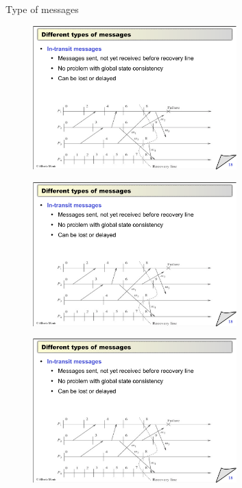 \begin{frame}{Type of messages}
\begin{overprint}
\begin{figure}
	\includegraphics[width=0.7\textwidth,page=1]{messages}
\end{figure}
\begin{figure}
	\includegraphics[width=0.7\textwidth,page=2]{messages}
\end{figure}
\begin{figure}
	\includegraphics[width=0.7\textwidth,page=3]{messages}
\end{figure}
\begin{figure}

\end{figure}
\end{overprint}
\end{frame}
